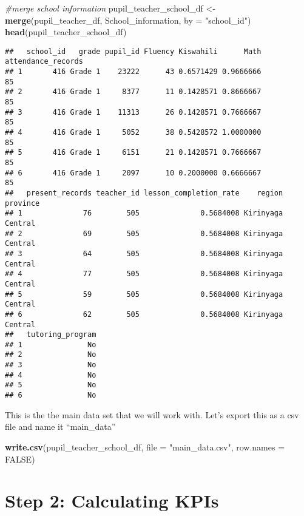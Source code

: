 \documentclass[
]{article}
\newenvironment{Shaded}{\begin{snugshade}}{\end{snugshade}}
\newcommand{\AttributeTok}[1]{\textcolor[rgb]{0.13,0.29,0.53}{#1}}
\newcommand{\CommentTok}[1]{\textcolor[rgb]{0.56,0.35,0.01}{\textit{#1}}}
\newcommand{\ConstantTok}[1]{\textcolor[rgb]{0.56,0.35,0.01}{#1}}
\newcommand{\FunctionTok}[1]{\textcolor[rgb]{0.13,0.29,0.53}{\textbf{#1}}}
\newcommand{\NormalTok}[1]{#1}
\newcommand{\OtherTok}[1]{\textcolor[rgb]{0.56,0.35,0.01}{#1}}
\newcommand{\StringTok}[1]{\textcolor[rgb]{0.31,0.60,0.02}{#1}}
\begin{document}
\begin{Shaded}
\begin{Highlighting}[]
\CommentTok{\#merge school information}
\NormalTok{pupil\_teacher\_school\_df }\OtherTok{\textless{}{-}} \FunctionTok{merge}\NormalTok{(pupil\_teacher\_df, School\_information, }\AttributeTok{by =} \StringTok{"school\_id"}\NormalTok{)}
\FunctionTok{head}\NormalTok{(pupil\_teacher\_school\_df)}
\end{Highlighting}
\end{Shaded}

\begin{verbatim}
##   school_id   grade pupil_id Fluency Kiswahili      Math attendance_records
## 1       416 Grade 1    23222      43 0.6571429 0.9666666                 85
## 2       416 Grade 1     8377      11 0.1428571 0.8666667                 85
## 3       416 Grade 1    11313      26 0.1428571 0.7666667                 85
## 4       416 Grade 1     5052      38 0.5428572 1.0000000                 85
## 5       416 Grade 1     6151      21 0.1428571 0.7666667                 85
## 6       416 Grade 1     2097      10 0.2000000 0.6666667                 85
##   present_records teacher_id lesson_completion_rate    region province
## 1              76        505              0.5684008 Kirinyaga  Central
## 2              69        505              0.5684008 Kirinyaga  Central
## 3              64        505              0.5684008 Kirinyaga  Central
## 4              77        505              0.5684008 Kirinyaga  Central
## 5              59        505              0.5684008 Kirinyaga  Central
## 6              62        505              0.5684008 Kirinyaga  Central
##   tutoring_program
## 1               No
## 2               No
## 3               No
## 4               No
## 5               No
## 6               No
\end{verbatim}

This is the the main data set that we will work with. Let's export this
as a csv file and name it ``main\_data''

\begin{Shaded}
\begin{Highlighting}[]
\FunctionTok{write.csv}\NormalTok{(pupil\_teacher\_school\_df, }\AttributeTok{file =} \StringTok{"main\_data.csv"}\NormalTok{, }\AttributeTok{row.names =} \ConstantTok{FALSE}\NormalTok{)}
\end{Highlighting}
\end{Shaded}

\hypertarget{step-2-calculating-kpis}{%
\section{Step 2: Calculating KPIs}\label{step-2-calculating-kpis}}
\end{document}
